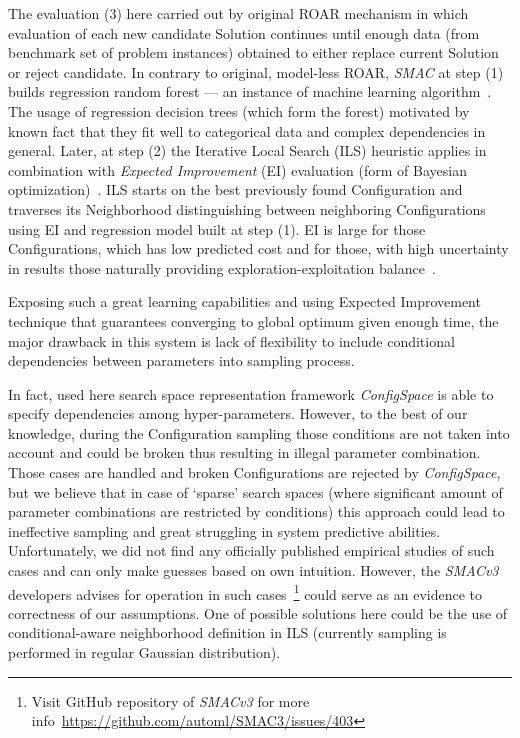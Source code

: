 The evaluation (3) here carried out by original ROAR mechanism in which evaluation of each new candidate Solution continues until enough data (from benchmark set of problem instances) obtained to either replace current Solution or reject candidate. In contrary to original, model-less ROAR, \textit{SMAC} at step (1) builds regression random forest — an instance of machine learning algorithm~\cite{breiman2001random}. The usage of regression decision trees (which form the forest) motivated by known fact that they fit well to categorical data and complex dependencies in general. Later, at step (2) the Iterative Local Search (ILS) heuristic applies in combination with \textit{Expected Improvement} (EI) evaluation (form of Bayesian optimization)~\cite{shahriari2015taking}. ILS starts on the best previously found Configuration and traverses its Neighborhood distinguishing between neighboring Configurations using EI and regression model built at step (1). EI is large for those Configurations, which has low predicted cost and for those, with high uncertainty in results those naturally providing exploration-exploitation balance~\cite{jones1998efficient}.

Exposing such a great learning capabilities and using Expected Improvement technique that guarantees converging to global optimum given enough time, the major drawback in this system is lack of flexibility to include conditional dependencies between parameters into sampling process. 

In fact, used here search space representation framework \textit{ConfigSpace}\cite{configspace} is able to specify dependencies among hyper-parameters. However, to the best of our knowledge, during the Configuration sampling those conditions are not taken into account and could be broken thus resulting in illegal parameter combination. Those cases are handled and broken Configurations are rejected by \textit{ConfigSpace}, but we believe that in case of `sparse' search spaces (where significant amount of parameter combinations are restricted by conditions) this approach could lead to ineffective sampling and great struggling in system predictive abilities. Unfortunately, we did not find any officially published empirical studies of such cases and can only make guesses based on own intuition. However, the \textit{SMACv3} developers advises for operation in such cases~\footnote{Visit GitHub repository of \textit{SMACv3} for more info~\url{https://github.com/automl/SMAC3/issues/403}} could serve as an evidence to correctness of our assumptions. One of possible solutions here could be the use of conditional-aware neighborhood definition in ILS (currently sampling is performed in regular Gaussian distribution). 

